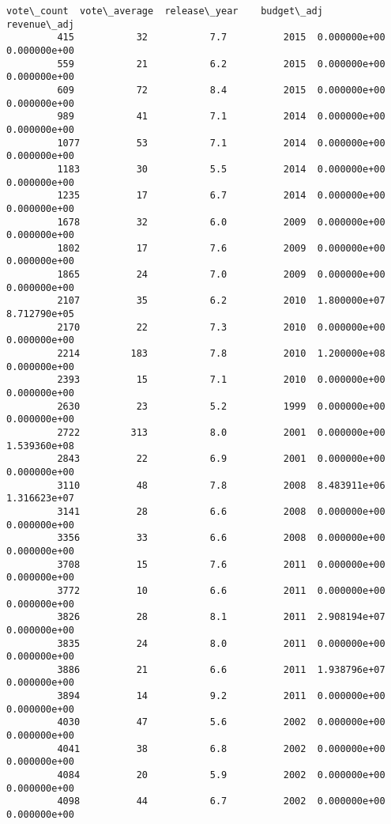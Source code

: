 \documentclass[11pt]{article}
\begin{document}
\begin{Verbatim}[commandchars=\\\{\}]
               vote\_count  vote\_average  release\_year    budget\_adj   revenue\_adj  
         415           32           7.7          2015  0.000000e+00  0.000000e+00  
         559           21           6.2          2015  0.000000e+00  0.000000e+00  
         609           72           8.4          2015  0.000000e+00  0.000000e+00  
         989           41           7.1          2014  0.000000e+00  0.000000e+00  
         1077          53           7.1          2014  0.000000e+00  0.000000e+00  
         1183          30           5.5          2014  0.000000e+00  0.000000e+00  
         1235          17           6.7          2014  0.000000e+00  0.000000e+00  
         1678          32           6.0          2009  0.000000e+00  0.000000e+00  
         1802          17           7.6          2009  0.000000e+00  0.000000e+00  
         1865          24           7.0          2009  0.000000e+00  0.000000e+00  
         2107          35           6.2          2010  1.800000e+07  8.712790e+05  
         2170          22           7.3          2010  0.000000e+00  0.000000e+00  
         2214         183           7.8          2010  1.200000e+08  0.000000e+00  
         2393          15           7.1          2010  0.000000e+00  0.000000e+00  
         2630          23           5.2          1999  0.000000e+00  0.000000e+00  
         2722         313           8.0          2001  0.000000e+00  1.539360e+08  
         2843          22           6.9          2001  0.000000e+00  0.000000e+00  
         3110          48           7.8          2008  8.483911e+06  1.316623e+07  
         3141          28           6.6          2008  0.000000e+00  0.000000e+00  
         3356          33           6.6          2008  0.000000e+00  0.000000e+00  
         3708          15           7.6          2011  0.000000e+00  0.000000e+00  
         3772          10           6.6          2011  0.000000e+00  0.000000e+00  
         3826          28           8.1          2011  2.908194e+07  0.000000e+00  
         3835          24           8.0          2011  0.000000e+00  0.000000e+00  
         3886          21           6.6          2011  1.938796e+07  0.000000e+00  
         3894          14           9.2          2011  0.000000e+00  0.000000e+00  
         4030          47           5.6          2002  0.000000e+00  0.000000e+00  
         4041          38           6.8          2002  0.000000e+00  0.000000e+00  
         4084          20           5.9          2002  0.000000e+00  0.000000e+00  
         4098          44           6.7          2002  0.000000e+00  0.000000e+00  

\end{Verbatim}
\end{document}
